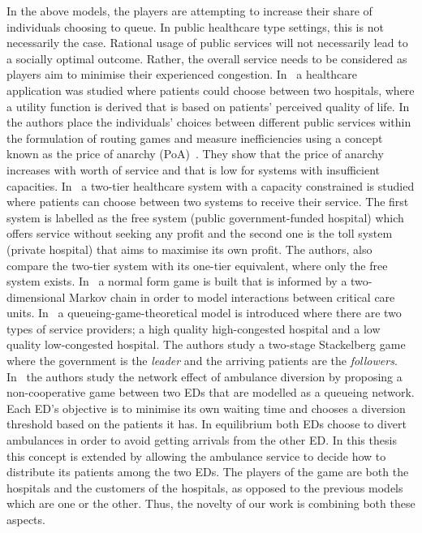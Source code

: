 In the above models, the players are attempting to increase their share of 
individuals choosing to queue.
In public healthcare type settings, this is not 
necessarily the case. 
Rational usage of public services will not necessarily lead to a socially
optimal outcome.
Rather, the overall service needs to be considered as players aim to minimise
their experienced congestion.
In~\cite{sadat2015can} a healthcare application was studied where patients 
could choose between two hospitals, where a utility function is derived that is
based on patients' perceived quality of life.
In~\cite{knight_public_services} the authors place the individuals' choices
between different public services  within the formulation of routing games and
measure inefficiencies using a 
concept known as the price of anarchy (PoA)~\cite{koutsoupias1999worst}.
They show that the price of anarchy increases with worth of service and that is
low for systems with insufficient capacities.
In~\cite{TwoTierHealthcareSystem} a two-tier healthcare system with a capacity
constrained is studied where patients can choose between two systems to receive
their service.
The first system is labelled as the free system (public government-funded
hospital) which offers service without seeking any profit and the second one is
the toll system (private hospital) that aims to maximise its own profit.
The authors, also compare the two-tier system with its one-tier equivalent,
where only the free system exists.
In~\cite{knight_measuring_poa} a normal form game is built that is informed by a 
two-dimensional Markov chain in order to model interactions between critical
care units.
In~\cite{EfficiencyQualityTradeOff} a queueing-game-theoretical model is
introduced where there are two types of service providers; a high quality
high-congested hospital and a low quality low-congested hospital.
The authors study a two-stage Stackelberg game where the government is the
\textit{leader} and the arriving patients are the \textit{followers}.
In~\cite{deo2011centralized} the authors study the network effect of ambulance 
diversion by proposing a non-cooperative game between two EDs that are modelled
as a queueing network.
Each ED's objective is to minimise its own waiting time and chooses a diversion
threshold based on the patients it has.
In equilibrium both EDs choose to divert ambulances in order to avoid getting
arrivals from the other ED.
In this thesis this concept is extended by allowing the ambulance service to 
decide how to distribute its patients among the two EDs.
The players of the game are both the hospitals and the customers of the
hospitals, as opposed to the previous models which are one or the other.
Thus, the novelty of our work is combining both these aspects.



